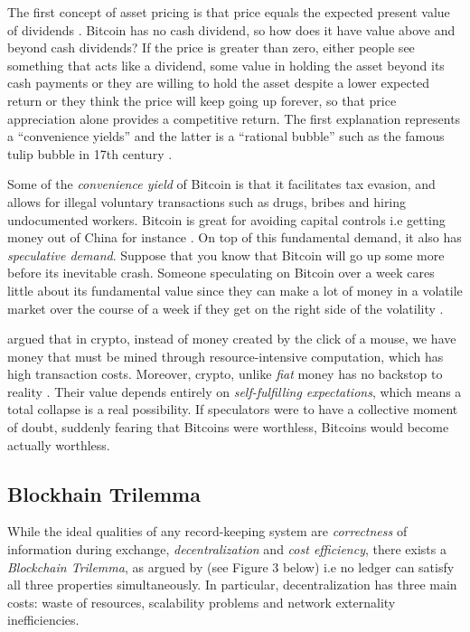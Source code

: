 \documentclass[12pt]{article}
\newcommand{\1}{\mathbbm 1}
\begin{document}
	

	The first concept of asset pricing is that price equals the expected present value of dividends \cite{cochrane2009asset}. Bitcoin has no cash dividend, so how does it have value above and beyond cash dividends? If the price is greater than zero, either people see something that acts like a dividend, some value in holding the asset beyond its cash payments or they are willing to hold the asset despite a lower expected return or they think the price will keep going up forever, so that price appreciation alone provides a competitive return. The first explanation represents a ``convenience yields'' and the latter is a ``rational bubble'' such as the famous tulip bubble in 17th century \cite{goldgar2008tulipmania}.
	
	Some of the \textit{convenience yield} of Bitcoin is that it facilitates tax evasion, and allows for illegal voluntary transactions such as drugs, bribes and hiring undocumented workers. Bitcoin is great for avoiding capital controls i.e getting money out of China for instance \cite{cochrane2017bitcoin}. On top of this fundamental demand, it also has \textit{speculative demand}. Suppose that you know that Bitcoin will go up some more before its inevitable crash. Someone speculating on Bitcoin over a week cares little about its fundamental value since they can make a lot of money in a volatile market over the course of a week if they get on the right side of the volatility \cite{cochrane2017bitcoin}.
	

	

	
	\cite{krugman2018transaction} argued that in crypto, instead of money created by the click of a mouse, we have money that must be mined through resource-intensive computation, which has high transaction costs. Moreover, crypto, unlike \textit{fiat} money has no backstop to reality \cite{krugman2018transaction}. Their value depends entirely on \textit{self-fulfilling expectations}, which means a total collapse is a real possibility. If speculators were to have a collective moment of doubt, suddenly fearing that Bitcoins were worthless, Bitcoins would become actually worthless.
	
	
	\subsection{Blockhain Trilemma}
	
	 While the ideal qualities of any record-keeping system are \textit{correctness} of information during exchange, \textit{decentralization} and \textit{cost efficiency}, there exists a \textit{Blockchain Trilemma}, as argued by \cite{abadi2018blockchain} (see Figure 3 below) i.e  no ledger can satisfy all three properties simultaneously. In particular, decentralization has three main costs: waste of resources, scalability problems and network externality inefficiencies. 
	 
\end{document}
